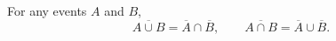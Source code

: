 For any events $A$ and $B$,
$$\overline{A \cup B} = \overline{A} \cap \overline{B}, \qquad \overline{A \cap B} = \overline{A} \cup \overline{B}.$$
